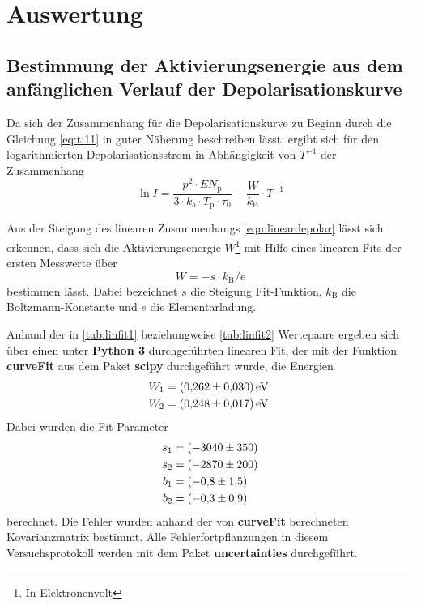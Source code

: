 \newpage
\section{Auswertung}
\label{sec:Auswertung}

\subsection{Bestimmung der Aktivierungsenergie aus dem anfänglichen Verlauf der Depolarisationskurve}
\label{subsec:method1}
Da sich der Zusammenhang für die Depolarisationskurve zu Beginn durch die Gleichung \eqref{eq:t:11} in guter Näherung
beschreiben lässt, ergibt sich für den logarithmierten Depolarisationsstrom in Abhängigkeit von $T^{-1}$ der Zusammenhang
\\
\begin{equation}
  \label{eqn:lineardepolar}
  \ln{I} = \frac{p^2 \cdot E N_\text{p} }{3 \cdot k_{b}
   \cdot T_\text{p} \cdot \tau_{0}} -\frac{W}{k_{\text{B}}} \cdot T^{-1}
\end{equation}

Aus der Steigung des linearen Zusammenhangs \eqref{eqn:lineardepolar} lässt sich erkennen, dass sich
die Aktivierungsenergie $W$\footnote{In Elektronenvolt} mit Hilfe eines linearen Fits der ersten Messwerte über
\\
\begin{equation}
  \label{eqn:W}
  W = -s \cdot k_\text{B} / e
\end{equation}
bestimmen lässt. Dabei bezeichnet $s$ die Steigung Fit-Funktion, $k_\text{B}$ die Boltzmann-Konstante und $e$ die Elementarladung.

Anhand der in \ref{tab:linfit1} beziehungweise \ref{tab:linfit2} Wertepaare ergeben sich über einen unter \textbf{Python 3}
durchgeführten linearen Fit, der mit der Funktion \textbf{curveFit} aus
dem Paket \textbf{scipy} durchgeführt wurde, die Energien
\\
\begin{align*}
  W_{1} &= \SI{0.262+-0.030}{\electronvolt} \\
  W_{2} &= \SI{0.248+-0.017}{\electronvolt}.
\end{align*}
Dabei wurden die Fit-Parameter
\\
\begin{align*}
  s_{1} &= \SI{-3040+-350}{}\\
  s_{2} &= \SI{-2870+-200}{}\\
  b_{1} &= \SI{-0.8+-1.5}{}\\
  b_{2} &= \SI{-0.3+-0.9}{}
\end{align*}
berechnet.
Die Fehler wurden anhand der von \textbf{curveFit} berechneten Kovarianzmatrix bestimmt. Alle Fehlerfortpflanzungen in diesem Versuchsprotokoll
werden mit dem Paket \textbf{uncertainties}\cite{uncertainties} durchgeführt.

